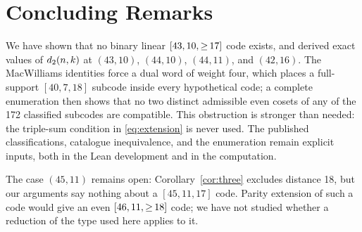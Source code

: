 \vspace{8pt}
\section{Concluding Remarks}
\label{sec:conclusion}
We have shown that no binary linear $\mbox{\ensuremath{[43,10,{\ge}\,17]}}$ code exists, and derived exact values of $d_2(n,k)$ at $(43,10)$, $(44,10)$, $(44,11)$, and $(42,16)$. The MacWilliams identities force a dual word of weight four, which places a full-support $[40,7,18]$ subcode inside every hypothetical code; a complete enumeration then shows that no two distinct admissible even cosets of any of the 172 classified subcodes are compatible. This obstruction is stronger than needed: the triple-sum condition in \eqref{eq:extension} is never used. The published classifications, catalogue inequivalence, and the enumeration remain explicit inputs, both in the Lean development and in the computation.

\vspace{8pt}
The case $(45,11)$ remains open: Corollary~\ref{cor:three} excludes distance 18, but our arguments say nothing about a $[45,11,17]$ code. Parity extension of such a code would give an even $\mbox{\ensuremath{[46,11,{\ge}\,18]}}$ code; we have not studied whether a reduction of the type used here applies to it.
